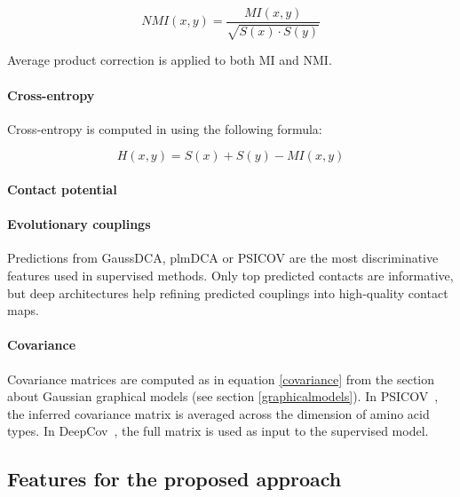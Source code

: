             \begin{equation}
                NMI(x, y) = \frac{MI(x, y)}{\sqrt{S(x) \cdot S(y)}}
            \end{equation}

            Average product correction is applied to both MI and NMI.

        \paragraph{Cross-entropy}

            Cross-entropy is computed in \cite{Michel383133} using the following formula:

            \begin{equation}
                H(x, y) = S(x) + S(y) - MI(x, y)
            \end{equation}

        \paragraph{Contact potential}

            \todo{}

        \paragraph{Evolutionary couplings}

            Predictions from GaussDCA, plmDCA or PSICOV are the most discriminative features
            used in supervised methods. Only top predicted contacts are informative, but deep
            architectures help refining predicted couplings into high-quality contact maps.

        \paragraph{Covariance}

            Covariance matrices are computed as in equation \ref{covariance} from the section
            about Gaussian graphical models (see section \ref{graphicalmodels}).
            In PSICOV~\cite{doi:10.1093/bioinformatics/btr638}, the inferred covariance
            matrix is averaged across the dimension of amino acid types.
            In DeepCov~\cite{doi:10.1093/bioinformatics/bty341}, the full matrix is used
            as input to the supervised model.

    \subsection{Features for the proposed approach}

